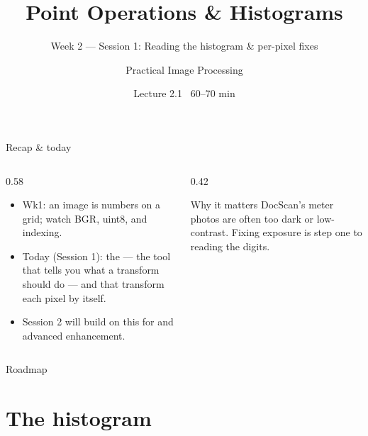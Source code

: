 \documentclass[10pt,aspectratio=169]{beamer}
\title{Point Operations \& Histograms}
\subtitle{Week 2 — Session 1: Reading the histogram \& per-pixel fixes}
\author{Practical Image Processing}
\date{Lecture 2.1 \textbullet\ 60--70 min}
\begin{document}
\maketitle

\begin{frame}{Recap \& today}
  \begin{columns}[T]
    \begin{column}{0.58\textwidth}
      \begin{itemize}
        \item Wk1: an image is numbers on a grid; watch BGR, uint8, and \code{[y,x]} indexing.
        \item \alert{Today (Session 1):} the  — the tool that tells you what a
              transform should do — and  that transform each pixel by itself.
        \item Session 2 will build on this for  and advanced enhancement.
      \end{itemize}
    \end{column}
    \begin{column}{0.42\textwidth}
      \begin{alertblock}{Why it matters}
        DocScan's meter photos are often too dark or low-contrast. Fixing exposure is step one
        to reading the digits.
      \end{alertblock}
    \end{column}
  \end{columns}
\end{frame}

\begin{frame}{Roadmap}\tableofcontents\end{frame}

\section{The histogram}
\end{document}
